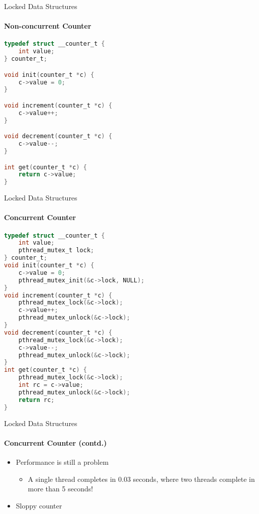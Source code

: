 \documentclass[10pt]{beamer}
\begin{document}
\begin{frame}[fragile]{Locked Data Structures}
\framesubtitle{Non-concurrent Counter}
\begin{lstlisting}[language=C]
typedef struct __counter_t {
	int value;
} counter_t;

void init(counter_t *c) {
	c->value = 0;
}

void increment(counter_t *c) {
	c->value++;
}

void decrement(counter_t *c) {
	c->value--;
}

int get(counter_t *c) {
	return c->value;
}
\end{lstlisting}
\end{frame}

\begin{frame}[fragile]{Locked Data Structures}
\framesubtitle{Concurrent Counter}
\begin{lstlisting}[language=C]
typedef struct __counter_t {
	int value;
	pthread_mutex_t lock;
} counter_t;
void init(counter_t *c) {
	c->value = 0;
	pthread_mutex_init(&c->lock, NULL);
}
void increment(counter_t *c) {
	pthread_mutex_lock(&c->lock);
	c->value++;
	pthread_mutex_unlock(&c->lock);
}
void decrement(counter_t *c) {
	pthread_mutex_lock(&c->lock);
	c->value--;
	pthread_mutex_unlock(&c->lock);
}
int get(counter_t *c) {
	pthread_mutex_lock(&c->lock);
	int rc = c->value;
	pthread_mutex_unlock(&c->lock);
	return rc;
}
\end{lstlisting}
\end{frame}

\begin{frame}{Locked Data Structures}
\framesubtitle{Concurrent Counter (contd.)}
\begin{itemize}
 
\item Performance is still a problem
\begin{itemize}
\item A single thread completes in 0.03 seconds, where two threads complete in more than 5 seconds!
\end{itemize}
\item Sloppy counter
\end{itemize}
\end{frame}
\end{document}
